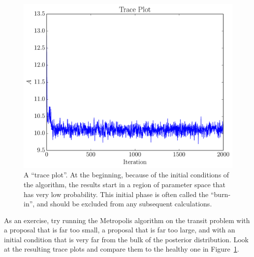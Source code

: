 \begin{figure}
\begin{center}
\includegraphics[scale=0.5]{trace_plot.pdf}
\caption{A ``trace plot''. At the beginning, because of the initial conditions
of the algorithm, the results start in a region of parameter space that has
very low probability. This initial phase is often called the ``burn-in'', and
should be excluded from any subsequent calculations.\label{fig:trace_plot}}
\end{center}
\end{figure}

As an exercise, try running the Metropolis algorithm on the transit problem
with a proposal that is far too small, a proposal that is far too large, and
with an initial condition that is very far from the bulk of the posterior
distribution. Look at the resulting trace plots and
compare them to the healthy one in Figure~\ref{fig:trace_plot}.


